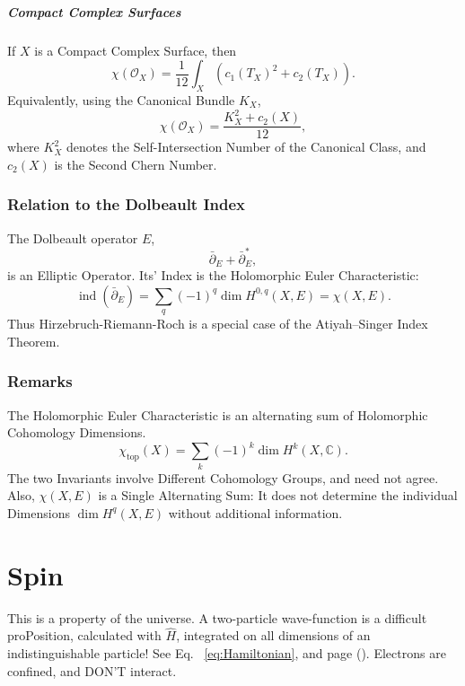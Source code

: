 \documentclass[a4paper, 10pt, onepage]{elegantbook}
\begin{document}
{\paragraph{Compact Complex Surfaces}

If \(X\) is a Compact Complex Surface, then
\begin{equation}
\chi(\mathcal{O}_X)
=
\frac{1}{12}
\int_X\left(c_1(T_X)^2+c_2(T_X)\right).
\end{equation}
Equivalently, using the Canonical Bundle \(K_X\),
\begin{equation}
\chi(\mathcal{O}_X)
=
\frac{K_X^2+c_2(X)}{12},
\end{equation}
where \(K_X^2\) denotes the Self-Intersection Number of the Canonical Class, and \(c_2(X)\) is the Second Chern Number.

\subsection{Relation to the Dolbeault Index}

The Dolbeault operator \(E\),
\[
\bar{\partial}_E+\bar{\partial}_E^*,
\]
is an Elliptic Operator. Its' Index is the Holomorphic Euler Characteristic:
\begin{equation}
\operatorname{ind}(\bar{\partial}_E)
=
\sum_q(-1)^q\dim H^{0,q}(X,E)
=
\chi(X,E).
\end{equation}
Thus Hirzebruch-Riemann-Roch is a special case of the Atiyah--Singer Index Theorem.

\subsection{Remarks}

The Holomorphic Euler Characteristic is an alternating sum of Holomorphic Cohomology 
Dimensions.
\[
\chi_{\mathrm{top}}(X)=\sum_k(-1)^k\dim H^k(X,\mathbb{C}).
\]
The two Invariants involve Different Cohomology Groups, and need not agree. Also, \(\chi(X,E)\) is a Single Alternating 
Sum: It does not determine the individual Dimensions \(\dim H^q(X,E)\) without additional information.



\chapter{Spin}

This is a property of the universe.  
A two-particle wave-function is a difficult proPosition, calculated with $\hat H$, integrated on all dimensions of an 
indistinguishable particle! See Eq.~ \eqref{eq:Hamiltonian}, and page (\pageref{ch:Atiyah-Singer Index Theorem}). 
Electrons are confined, and DON'T interact.  



}
\end{document}
